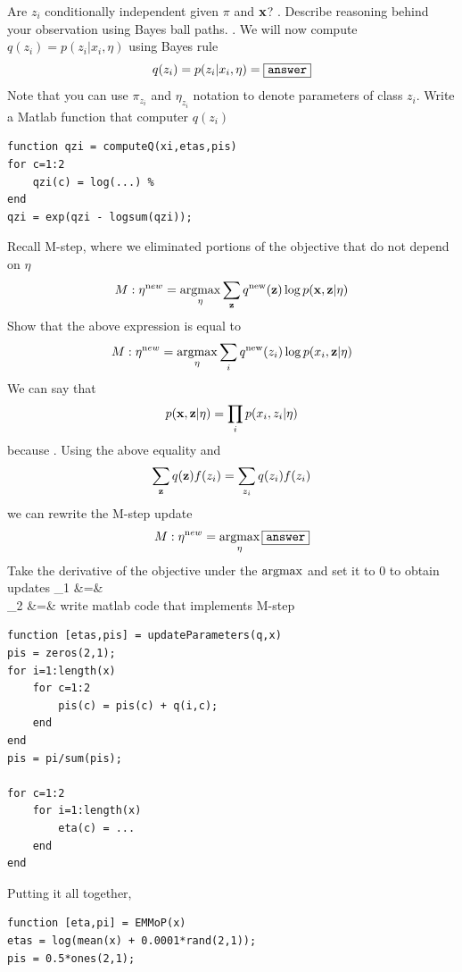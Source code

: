 \documentclass{article}
\begin{document}
{\begin{center}
\end{center}
Are $z_i$ conditionally independent given $\pi$ and $\mathbf{x}$? \answer.
Describe reasoning behind your observation using Bayes ball paths. \answer.
\newproblem{1pt} We will now compute $q(z_i) = p(z_i | x_i,\eta)$ using Bayes rule
\[
q(z_i) = p(z_i | x_i,\eta) = \fbox{\tt answer}
\]
Note that you can use $\pi_{z_i}$ and $\eta_{z_i}$ notation to denote parameters of class $z_i$.
Write a Matlab function that computer $q(z_i)$
\begin{verbatim}
function qzi = computeQ(xi,etas,pis)
for c=1:2
    qzi(c) = log(...) %
end
qzi = exp(qzi - logsum(qzi));
\end{verbatim}
\newproblem{1pt} Recall M-step, where we eliminated portions of the objective that do not depend on $\eta$
\[
M: \eta^{\textrm new} = \mathop{\rm argmax}_\eta  \sum_{\mathbf{z}} q^{\textrm{new}}(\mathbf{z}) \log p(\mathbf{x},\mathbf{z}|\eta)
\]
Show that the above expression is equal to
\[
M: \eta^{\textrm new} = \mathop{\rm argmax}_\eta  \sum_i q^{\textrm{new}}(z_i)\log p(x_i,\mathbf{z}|\eta)
\]
We can say that
\[
p(\mathbf{x},\mathbf{z}|\eta) = \prod_i p(x_i,z_i|\eta)
\]
because \answer.
Using the above equality and
\[
\sum_{\mathbf{z}} q(\mathbf{z}) f(z_i) = \sum_{z_i} q(z_i) f(z_i)
\]
we can rewrite the M-step update
\[
M: \eta^{\textrm new} = \mathop{\rm argmax}_\eta  \fbox{\tt answer}
\]
Take the derivative of the objective under the  $\mathop{\rm argmax}$ and set it to $0$ to obtain updates
\BEAS
\eta_1 &=& \answer\\
\eta_2 &=& \answer
\EEAS
write matlab code that implements M-step
\begin{verbatim}
function [etas,pis] = updateParameters(q,x)
pis = zeros(2,1);
for i=1:length(x)
    for c=1:2
        pis(c) = pis(c) + q(i,c);
    end
end
pis = pi/sum(pis);

for c=1:2
    for i=1:length(x)
        eta(c) = ...
    end
end
\end{verbatim}


\newproblem{2pt} Putting it all together,
\begin{verbatim}
function [eta,pi] = EMMoP(x)
etas = log(mean(x) + 0.0001*rand(2,1));
pis = 0.5*ones(2,1);


\end{verbatim}}
\end{document}
